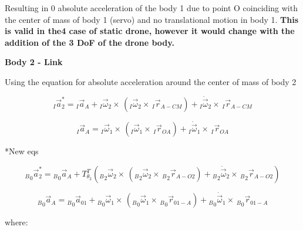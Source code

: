  Resulting in 0 absolute acceleration of the body 1 due to point O coinciding with the center of mass of body 1 (servo) and no translational motion in body 1.  \textbf{This is valid in the4 case of static drone, however it would change with the addition of the 3 DoF of the drone body. }
 
 
\textbf{Body 2 - Link}
 
 Using the equation for absolute acceleration around the center of mass of body 2
 
 \begin{equation}\label{aabody2}
	_I\vec{a}_{2}^* = {_I}\vec{a}_{A} + {_I}\vec{\omega}_{2}\times \,({_I}\vec{\omega}_{2}\times \,{_I}\vec{r}_{A-CM}) + {_I}\dot{\vec{\omega}}_{2}\times \,{_I}\vec{r}_{A-CM}
\end{equation}

\begin{equation}\label{aabody23}
	 {_I}\vec{a}_{A} = {_I}\vec{\omega}_{1}\times \,({_I}\vec{\omega}_{1}\times \,{_I}\vec{r}_{OA}) + {_I}\dot{\vec{\omega}}_{1}\times \,{_I}\vec{r}_{OA}
\end{equation}

*New eqs

\begin{equation}\label{aabody2a}
{_B}_{0}\vec{a}_{2}^* = {_B}_{0}\vec{a}_{A}+ T_{\theta _2}^T({_B}_{2}\vec{\omega}_{2}\times \,({_B}_{2}\vec{\omega}_{2}\times \,{_B}_{2}\vec{r}_{A-O2}) + {_B}_{2}\dot{\vec{\omega}}_{2}\times \,{_B}_{2}\vec{r}_{A-O2})
\end{equation}

\begin{equation}\label{aabody2b}
{_B}_{0}\vec{a}_{A} = {_B}_{0}\vec{a}_{01}+{_B}_{0}\vec{\omega}_{1}\times \,({_B}_{0}\vec{\omega}_{1}\times \,{_B}_{0}\vec{r}_{01-A}) + {_B}_{0}\dot{\vec{\omega}}_{1}\times \,{_B}_{0}\vec{r}_{01-A}
\end{equation}


where:

